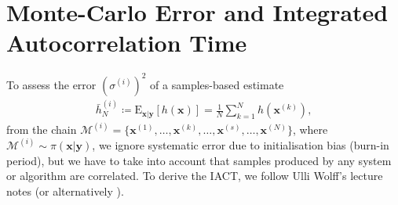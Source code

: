 \section{Monte-Carlo Error and Integrated Autocorrelation Time}
\label{ap:IATC}
To assess the error $(\sigma^{(i)})^2$ of a samples-based estimate 
\begin{align}
	\bar{h}_N^{(i)} \coloneqq	\text{E}_{\bm{x}|\bm{y}} [h(\bm{x})] = \frac{1}{N} \sum_{k=1}^{N} h(\bm{x}^{(k)}),
\end{align} 
from the chain $\mathcal{M}^{(i)} = \{\bm{x}^{(1)}, \dots,\bm{x}^{(k)},\dots, \bm{x}^{(s)},\dots, \bm{x}^{(N)}\}$, where $\mathcal{M}^{(i)} \sim \pi(\bm{x}|\bm{y})$, we ignore systematic error due to initialisation bias (burn-in period), but we have to take into account that samples produced by any system or algorithm are correlated.
To derive the IACT, we follow Ulli Wolff's lecture notes \cite{wolff2002LecNot} (or alternatively \cite{wolff2004monte}).

